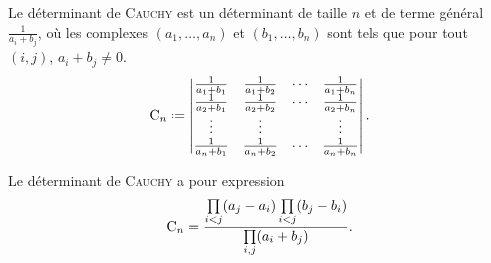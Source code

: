 \begin{defi}
    Le déterminant de \textsc{Cauchy} est un déterminant de taille $n$ et de terme général $\frac{1}{a_i+b_j}$, où les complexes $(a_1, \dots, a_n)$ et $(b_1, \dots, b_n)$ sont tels que pour tout $(i, j)$, $a_i+b_j \not= 0$.
    $$\Cauchy_n \defeq \begin{vmatrix}
        \frac{1}{a_1+b_1} & \frac{1}{a_1+b_2} & \cdots & \frac{1}{a_1+b_n} \\
        \frac{1}{a_2+b_1} & \frac{1}{a_2+b_2} & \cdots & \frac{1}{a_2+b_n} \\
        \vdots & \vdots & & \vdots \\
        \frac{1}{a_n+b_1} & \frac{1}{a_n+b_2} & \cdots & \frac{1}{a_n+b_n}
    \end{vmatrix}.$$
\end{defi}

\begin{prop}
    Le déterminant de \textsc{Cauchy} a pour expression
    $$\mathrm{C}_n = \frac{\prod\limits_{i<j}(a_j-a_i) \prod\limits_{i<j}(b_j-b_i)}{\prod\limits_{i,j}(a_i+b_j)}.$$
\end{prop}
        
